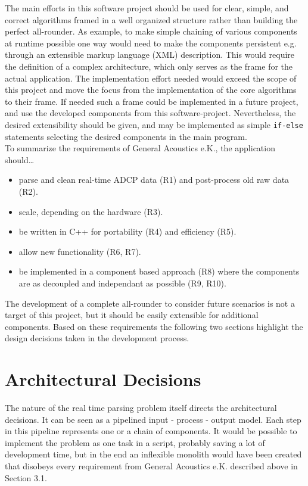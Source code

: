 The main efforts in this software project should be used for clear, simple, and correct algorithms framed in a well organized structure rather than building the perfect all-rounder. As example, to make simple chaining of various components at runtime possible one way would need to make the components persistent e.g. through an extensible markup language (XML) description. This would require the definition of a complex architecture, which only serves as the frame for the actual application. The implementation  effort needed would exceed the scope of this project and move the focus from the implementation of the core algorithms to their frame. If needed such a frame could be implemented in a future project, and use the developed components from this software-project. Nevertheless, the desired extensibility should be given, and may be implemented as simple \texttt{if-else} statements selecting the desired components in the main program.\\ 

To summarize the requirements of General Acoustics e.K., the application should\dots
\begin{itemize}
\item parse and clean real-time ADCP data (R1) and post-process old raw data (R2).
\item scale, depending on the hardware (R3).
\item be written in C++ for portability (R4) and efficiency (R5).
\item allow new functionality (R6, R7).
\item be implemented in a component based approach (R8) where the components are as decoupled and independant as possible (R9, R10).
\end{itemize}
The development of a complete all-rounder to consider future scenarios is not a target of this project, but it should be easily extensible for additional components. Based on these requirements the following two sections highlight the design decisions taken in the development process. 

\section{Architectural Decisions}
The nature of the real time parsing problem itself directs the architectural decisions. It can be seen as a pipelined input - process - output model. Each step in this pipeline represents one or a chain of components. It would be possible to implement the problem as one task in a script, probably saving a lot of development time, but in the end an inflexible monolith would have been created that disobeys every requirement from General Acoustics e.K. described above in Section 3.1.\\

